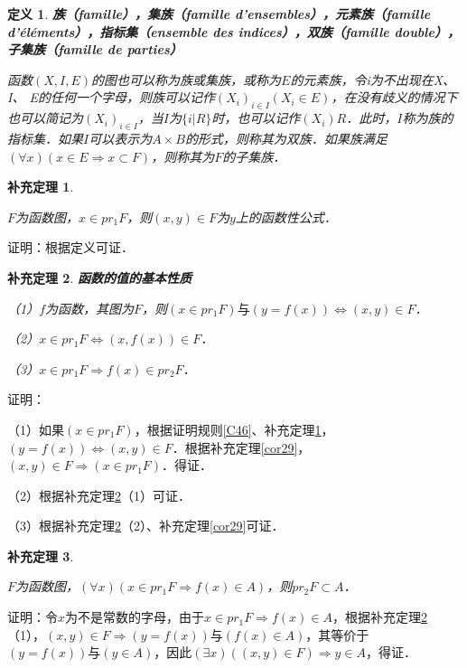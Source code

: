 \documentclass[12pt, a4paper, oneside]{book}
\newtheorem{cor}{补充定理}
\newtheorem{de}{定义}
\begin{document}
			\begin{de}
				\textbf{族（famille），集族（famille d'ensembles），元素族（famille d'éléments），指标集（ensemble des indices），双族（famille double），子集族（famille de parties）}
				\par
				函数$(X, I, E)$的图也可以称为族或集族，或称为$E$的元素族，令i为不出现在X、I、
				E的任何一个字母，则族可以记作$(X_i)_{i\in I}(X_i\in E)$，在没有歧义的情况下也可以简记为$(X_i)_{i\in I}$，当$I$为$\{i|R\}$时，也可以记作$(X_i)R$．此时，$I$称为族的指标集．如果$I$可以表示为$A\times B$的形式，则称其为双族．如果族满足$(\forall x)(x\in E\Rightarrow x\subset F)$，则称其为$F$的子集族．			
			\end{de}

			\begin{cor}\label{cor63}
				\hfill\par
				$F$为函数图，$x\in pr_1F$，则$(x, y)\in F$为$y$上的函数性公式．
			\end{cor}
			证明：根据定义可证．
			
			\begin{cor}\label{cor64}
				\textbf{函数的值的基本性质}
				\par
				（1）$f$为函数，其图为$F$，则$(x\in pr_1F)\text{与}(y=f(x))\Leftrightarrow (x, y)\in F$．
				\par
				（2）$x\in pr_1F\Leftrightarrow (x, f(x))\in F$．
				\par
				（3）$x\in pr_1F\Rightarrow f(x)\in pr_2F$．
			\end{cor}
			证明：
			\par
			（1）如果$(x\in pr_1F)$，根据证明规则\ref{C46}、补充定理\ref{cor63}，$(y=f(x))\Leftrightarrow (x, y)\in F$．根据补充定理\ref{cor29}，$(x, y)\in F\Rightarrow (x\in pr_1F)$．得证．
			\par
			（2）根据补充定理\ref{cor64}（1）可证．
			\par
			（3）根据补充定理\ref{cor64}（2）、补充定理\ref{cor29}可证．
			
			\begin{cor}\label{cor65}
				\hfill\par
				$F$为函数图，$(\forall x)(x\in pr_1F\Rightarrow f(x)\in A)$，则$pr_2F\subset A$．
			\end{cor}
			证明：令$x$为不是常数的字母，由于$x\in pr_1F\Rightarrow f(x)\in A$，根据补充定理\ref{cor64}（1），$(x, y)\in F\Rightarrow (y=f(x))\text{与}(f(x)\in A)$，其等价于$(y=f(x))\text{与}(y\in A)$，因此$(\exists x)((x, y)\in F)\Rightarrow y\in A$，得证．
			
\end{document}
